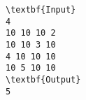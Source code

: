 \begin{verbatim}
\textbf{Input}
4
10 10 10 2
10 10 3 10
4 10 10 10
10 5 10 10
\textbf{Output}
5
\end{verbatim}
